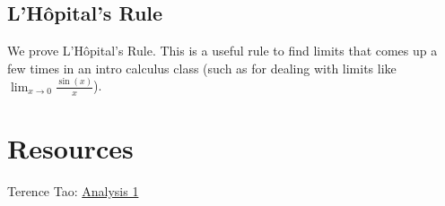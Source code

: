 \documentclass[answers,12pt]{exam}
\begin{document}
\subsection{L'H\^opital's Rule}
We prove L'H\^opital's Rule.
This is a useful rule to find limits that comes up a few times in an intro calculus class (such as for dealing with limits like $\lim_{x \to 0} \frac{\sin(x)}{x}$).

\section{Resources}
Terence Tao: \href{https://terrytao.wordpress.com/books/analysis-i/}{Analysis 1}
\end{document}
